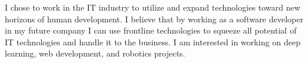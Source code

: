 I chose to work in the IT industry to utilize and expand technologies 
toward new horizons of human development. I believe that by working as a software developer in my future company I can use frontline technologies to squeeze all potential of IT technologies and handle it to the business. I am interested in working on deep learning, web development, and robotics projects.
